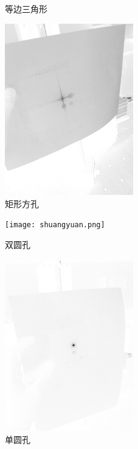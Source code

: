 \documentclass{ctexart}
\begin{document}
\begin{figure}
\begin{minipage}[t]{0.5\linewidth}
    \caption{等边三角形}  
    \label{fig:side:a}  
    \end{minipage}%
    \begin{minipage}[t]{0.5\linewidth}  
    \centering  
    \includegraphics[width=2.2in]{jufang.png}  
    \caption{矩形方孔}  
    \label{fig:side:b}  
    \end{minipage}  
    \end{figure}  \begin{figure}  
      \begin{minipage}[t]{0.5\linewidth}  
      \centering  
      \texttt{[image: shuangyuan.png]}  
      \caption{双圆孔}  
      \label{fig:side:a}  
      \end{minipage}%
      \begin{minipage}[t]{0.5\linewidth}  
      \centering  
      \includegraphics[width=2.2in]{danyuan.png}  
      \caption{单圆孔}  
      \label{fig:side:b}  
      \end{minipage}  
      \end{figure}  \begin{figure}  
        \begin{minipage}[t]{0.5\linewidth}  

\end{minipage}
\end{figure}
\end{document}
